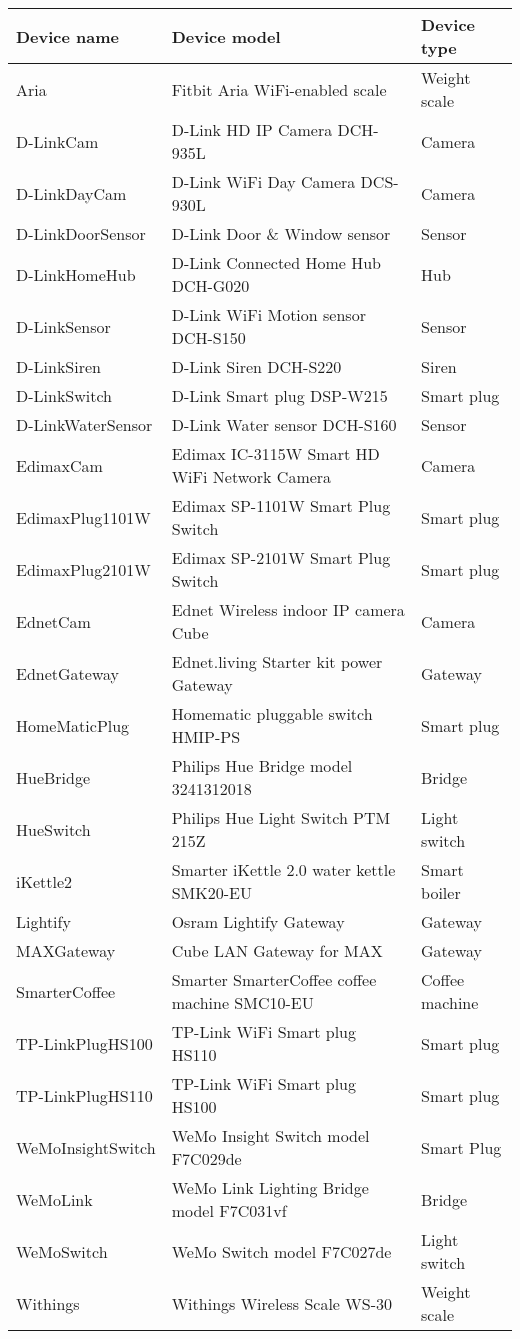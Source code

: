 \begin{table}[!h]
    \centering
    \begin{tabular}{l|l|l}
    \toprule
     Device name & Device model & Device type  \\
    \midrule
  Aria              & Fitbit Aria WiFi-enabled scale  &  Weight scale \\
  D-LinkCam         & D-Link HD IP Camera DCH-935L    &  Camera \\
  D-LinkDayCam      & D-Link WiFi Day Camera DCS-930L &  Camera \\
  D-LinkDoorSensor  & D-Link Door \& Window sensor     &  Sensor\\
  D-LinkHomeHub     &  D-Link Connected Home Hub DCH-G020 &  Hub  \\
  D-LinkSensor      & D-Link WiFi Motion sensor DCH-S150 &  Sensor \\
  D-LinkSiren       & D-Link Siren DCH-S220&  Siren \\
  D-LinkSwitch      & D-Link Smart plug DSP-W215  &  Smart plug \\
  D-LinkWaterSensor & D-Link Water sensor DCH-S160 &  Sensor \\
  EdimaxCam         & Edimax IC-3115W Smart HD WiFi Network Camera &  Camera \\
  EdimaxPlug1101W   & Edimax SP-1101W Smart Plug Switch  &  Smart plug \\
  EdimaxPlug2101W   & Edimax SP-2101W Smart Plug Switch&  Smart plug \\
  EdnetCam          & Ednet Wireless indoor IP camera Cube  &  Camera\\
  EdnetGateway      & Ednet.living Starter kit power Gateway & Gateway \\
  HomeMaticPlug     & Homematic pluggable switch HMIP-PS & Smart plug \\
  HueBridge         & Philips Hue Bridge model 3241312018 &  Bridge\\
  HueSwitch         & Philips Hue Light Switch PTM 215Z &  Light switch \\
  iKettle2          &  Smarter iKettle 2.0 water kettle SMK20-EU & Smart boiler \\
  Lightify          & Osram Lightify Gateway & Gateway \\
  MAXGateway        & Cube LAN Gateway for MAX & Gateway \\
  SmarterCoffee     & Smarter SmarterCoffee coffee machine SMC10-EU &  Coffee machine\\
  TP-LinkPlugHS100  & TP-Link WiFi Smart plug HS110 & Smart plug \\
  TP-LinkPlugHS110  & TP-Link WiFi Smart plug HS100 & Smart plug \\
  WeMoInsightSwitch & WeMo Insight Switch model F7C029de & Smart Plug \\
  WeMoLink          & WeMo Link Lighting Bridge model F7C031vf & Bridge  \\
  WeMoSwitch        & WeMo Switch model F7C027de & Light switch \\
  Withings          &  Withings Wireless Scale WS-30 &  Weight scale\\
        

\end{tabular}
\end{table}
